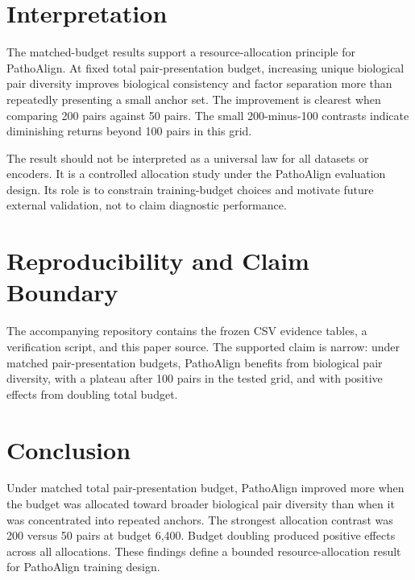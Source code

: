 \documentclass[10pt]{article}
\begin{document}
\section{Interpretation}

The matched-budget results support a resource-allocation principle for PathoAlign. At fixed total pair-presentation budget, increasing unique biological pair diversity improves biological consistency and factor separation more than repeatedly presenting a small anchor set. The improvement is clearest when comparing 200 pairs against 50 pairs. The small 200-minus-100 contrasts indicate diminishing returns beyond 100 pairs in this grid.

The result should not be interpreted as a universal law for all datasets or encoders. It is a controlled allocation study under the PathoAlign evaluation design. Its role is to constrain training-budget choices and motivate future external validation, not to claim diagnostic performance.

\section{Reproducibility and Claim Boundary}

The accompanying repository contains the frozen CSV evidence tables, a verification script, and this paper source. The supported claim is narrow: under matched pair-presentation budgets, PathoAlign benefits from biological pair diversity, with a plateau after 100 pairs in the tested grid, and with positive effects from doubling total budget.

\section{Conclusion}

Under matched total pair-presentation budget, PathoAlign improved more when the budget was allocated toward broader biological pair diversity than when it was concentrated into repeated anchors. The strongest allocation contrast was 200 versus 50 pairs at budget 6,400. Budget doubling produced positive effects across all allocations. These findings define a bounded resource-allocation result for PathoAlign training design.
\end{document}
